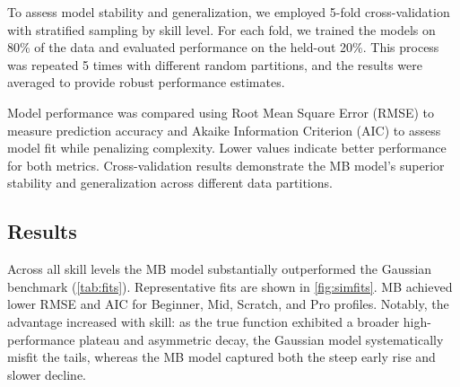 \documentclass{article}
\begin{document}
To assess model stability and generalization, we employed 5-fold cross-validation with stratified sampling by skill 
level. For each fold, we trained the models on 80\% of the data and evaluated performance on the held-out 20\%. 
This process was repeated 5 times with different random partitions, and the results were averaged to provide robust 
performance estimates.

Model performance was compared using Root Mean Square Error (RMSE) to measure prediction accuracy and Akaike 
Information Criterion (AIC) to assess model fit while penalizing complexity. Lower values indicate better performance 
for both metrics. Cross-validation results demonstrate the MB model's superior stability and generalization across 
different data partitions.

\subsection*{Results} Across all skill levels the MB model substantially outperformed the Gaussian benchmark
(\cref{tab:fits}). Representative fits are shown in \cref{fig:simfits}. MB achieved lower RMSE and AIC for Beginner,
Mid, Scratch, and Pro profiles. Notably, the advantage increased with skill: as the true function exhibited a broader
high-performance plateau and asymmetric decay, the Gaussian model systematically misfit the tails, whereas the MB model
captured both the steep early rise and slower decline.
\end{document}
